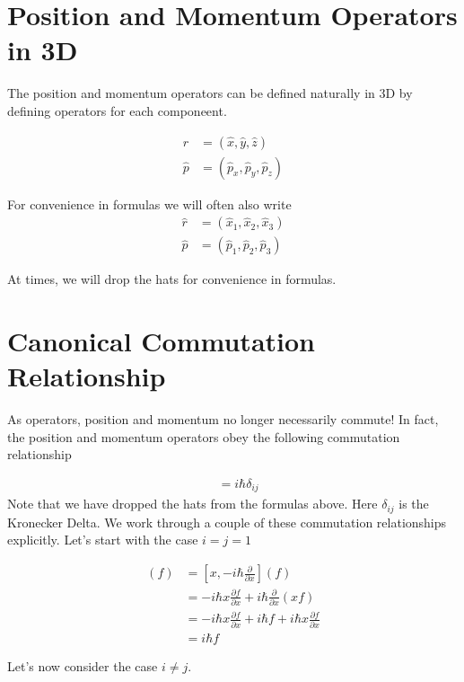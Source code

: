 \documentclass[book.tex]{subfiles}
\begin{document}
\section{Position and Momentum Operators in 3D}

The position and momentum operators can be defined naturally in 3D by defining operators for each componeent.

\begin{align}
    \hat{r} &= (\hat{x}, \hat{y}, \hat{z}) \\
    \hat{p} &= (\hat{p}_x, \hat{p}_y, \hat{p}_z)
\end{align}

For convenience in formulas we will often also write
\begin{align}
    \hat{r} &= (\hat{x}_1, \hat{x}_2, \hat{x}_3) \\
    \hat{p} &= (\hat{p}_1, \hat{p}_2, \hat{p}_3)
\end{align}

At times, we will drop the hats for convenience in formulas.

\section{Canonical Commutation Relationship}

As operators, position and momentum no longer necessarily commute! In fact, the position and momentum operators obey the following commutation relationship

\begin{align}
    [x_i, p_j] &= i \hbar \delta_{ij}
\end{align}
Note that we have dropped the hats from the formulas above. Here $\delta_{ij}$ is the Kronecker Delta. We work through a couple of these commutation relationships explicitly. Let's start with the case $i = j = 1$

\begin{align}
    [x_1, p_1](f) &= [x, -i\hbar \frac{\partial}{\partial x}](f) \\
    &= -i\hbar x\frac{\partial f}{\partial x}  + i \hbar \frac{\partial}{\partial x} \left (x f \right) \\
    &= -i\hbar x\frac{\partial f}{\partial x}  + i \hbar f + i \hbar x \frac{\partial f}{\partial x} \\
    &= i \hbar f
\end{align}

Let's now consider the case $i \neq j$.
\end{document}
